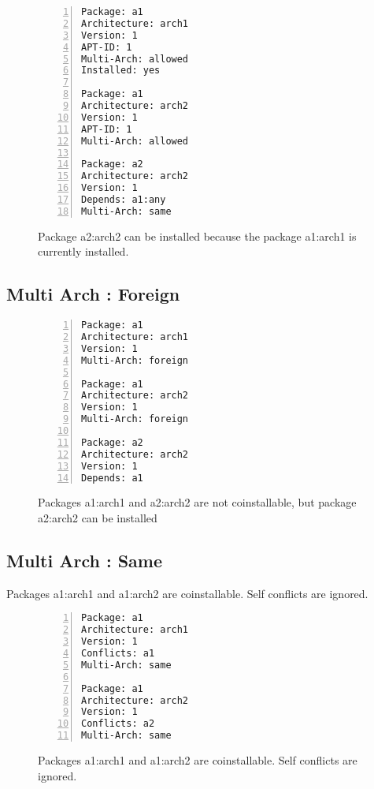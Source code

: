 \begin{figure}
\begin{lstlisting}[style=debctrl,numbers=left,xleftmargin=20pt,basicstyle=\footnotesize\normalfont\ttfamily]
Package: a1
Architecture: arch1
Version: 1
APT-ID: 1
Multi-Arch: allowed
Installed: yes

Package: a1
Architecture: arch2
Version: 1
APT-ID: 1
Multi-Arch: allowed

Package: a2
Architecture: arch2
Version: 1
Depends: a1:any
Multi-Arch: same
\end{lstlisting}
\caption{Package a2:arch2 can be installed because the package a1:arch1
is currently installed.}
\label{fig:arch-allowed}
\end{figure}

\subsection{Multi Arch : Foreign}

\begin{figure}
\begin{lstlisting}[style=debctrl,numbers=left,xleftmargin=20pt,basicstyle=\footnotesize\normalfont\ttfamily]
Package: a1
Architecture: arch1
Version: 1
Multi-Arch: foreign

Package: a1
Architecture: arch2
Version: 1
Multi-Arch: foreign

Package: a2
Architecture: arch2
Version: 1
Depends: a1
\end{lstlisting}
\caption{Packages a1:arch1 and a2:arch2 are not coinstallable, but
package a2:arch2 can be installed}
\label{fig:arch-foreign}
\end{figure}



\subsection{Multi Arch : Same}

Packages a1:arch1 and a1:arch2 are coinstallable. Self conflicts are
ignored.

\begin{figure}
\begin{lstlisting}[style=debctrl,numbers=left,xleftmargin=20pt,basicstyle=\footnotesize\normalfont\ttfamily]
Package: a1
Architecture: arch1
Version: 1
Conflicts: a1
Multi-Arch: same

Package: a1
Architecture: arch2
Version: 1
Conflicts: a2
Multi-Arch: same
\end{lstlisting}
\caption{Packages a1:arch1 and a1:arch2 are coinstallable. Self
conflicts are ignored.}
\label{fig:arch-same-1}
\end{figure}

